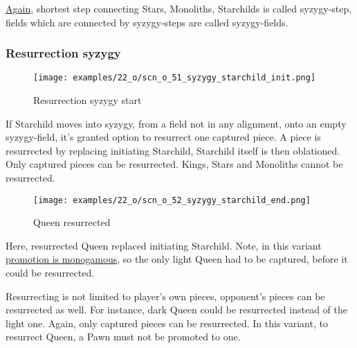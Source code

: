 \hyperref[fig:scn_d_21_syzygy_explain]{Again}, shortest step connecting
Stars, Monoliths, Starchilds is called syzygy-step, fields which are connected by
syzygy-steps are called syzygy-fields.

\clearpage %

\subsubsection*{Resurrection syzygy}
\label{sec:One/Starchild/Syzygy/Resurrection syzygy}

\vspace*{-1.4\baselineskip}
\noindent
\begin{figure}[!h]
\texttt{[image: examples/22\_o/scn\_o\_51\_syzygy\_starchild\_init.png]}
\caption{Resurrection syzygy start}
\label{fig:scn_o_51_syzygy_starchild_init}
\end{figure}

If Starchild moves into syzygy, from a field not in any alignment, onto an empty
syzygy-field, it's granted option to resurrect one captured piece. A piece is
resurrected by replacing initiating Starchild, Starchild itself is then oblationed.
Only captured pieces can be resurrected. Kings, Stars and Monoliths cannot be
resurrected.

\clearpage %

\vspace*{-2.1\baselineskip}
\noindent
\begin{figure}[!h]
\texttt{[image: examples/22\_o/scn\_o\_52\_syzygy\_starchild\_end.png]}
\vspace*{-1.4\baselineskip}
\caption{Queen resurrected}
\label{fig:scn_o_52_syzygy_starchild_end}
\end{figure}

\vspace*{-0.3\baselineskip}
Here, resurrected Queen replaced initiating Starchild. Note, in this variant
\hyperref[sec:One/Promotion]{promotion is monogamous}, so the only light Queen
had to be captured, before it could be resurrected.

Resurrecting is not limited to player's own pieces, opponent's pieces can be
resurrected as well. For instance, dark Queen could be resurrected instead of
the light one. Again, only captured pieces can be resurrected. In this variant,
to resurrect Queen, a Pawn must not be promoted to one.

